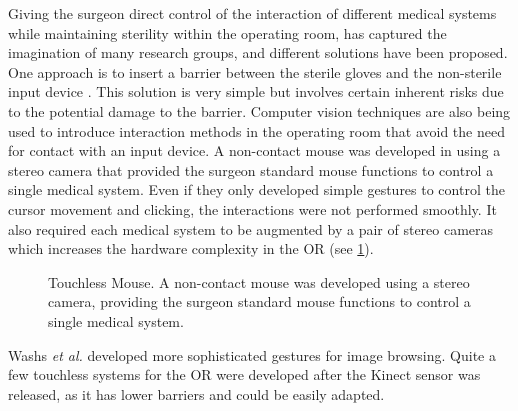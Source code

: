 Giving the surgeon direct control of the interaction of different medical systems while maintaining sterility within the operating room, has captured the imagination of many research groups, and different solutions have been proposed. 
One approach is to insert a barrier between the sterile gloves and the non-sterile input device \cite{Ionescu2006}. This solution is very simple but involves certain inherent risks due to the potential damage to the barrier. Computer vision techniques are also being used to introduce interaction methods in the operating room that avoid the need for contact with an input device.
A non-contact mouse was developed in \cite{Gratzel2004a} using a stereo camera that provided the surgeon standard mouse functions to control a single medical system. Even if they only developed simple gestures to control the cursor movement and clicking, the interactions were not performed smoothly. It also required each medical system to be augmented by a pair of stereo cameras which increases the hardware complexity in the OR (see \figurename{\ref{fig:2-bg:touchlessMouse}}). 
\begin{figure}
	\centering
	\qquad
	\caption{Touchless Mouse. A non-contact mouse was developed using a stereo camera, providing the surgeon standard mouse functions to control a single medical system.}
	\label{fig:2-bg:touchlessMouse}
\end{figure}
Washs \textit{et al.} \cite{Wachs2008} developed more sophisticated gestures for image browsing.
Quite a few touchless systems \cite{Strickland2013,Ebert2013,Tan2013} for the OR were developed after the Kinect sensor was released, as it has lower barriers and could be easily adapted.
